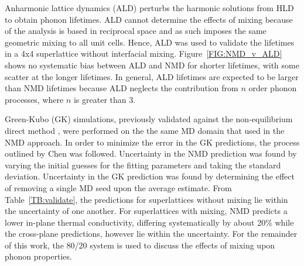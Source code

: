 Anharmonic lattice dynamics \cite{PhysRevB.79.064301} (ALD) perturbs the harmonic solutions from HLD to obtain phonon lifetimes. ALD cannot determine the effects of mixing because of the analysis is based in reciprocal space and as such imposes the same geometric mixing to all unit cells. Hence, ALD was used to validate the lifetimes in a 4x4 superlattice without interfacial mixing. Figure~\ref{FIG:NMD_v_ALD} shows no systematic bias between ALD and NMD for shorter lifetimes, with some scatter at the longer lifetimes. In general, ALD lifetimes are expected to be larger than NMD lifetimes because ALD neglects the contribution from $n$ order phonon processes, where $n$ is greater than 3. 

Green-Kubo (GK) simulations, previously validated against the non-equilibrium direct method \cite {PhysRevB.79.075316}, were performed on the the same MD domain that used in the NMD approach. In order to minimize the error in the GK predictions, the process outlined by Chen \cite{Chen20102392} was followed.  Uncertainty in the NMD prediction was found by varying the initial guesses for the fitting parameters and taking the standard deviation. Uncertainty in the GK prediction was found by determining the effect of removing a single MD seed upon the average estimate. From Table~\ref{TB:validate}, the predictions for superlattices without mixing lie within the uncertainty of one another. For superlattices with mixing, NMD predicts a lower in-plane thermal conductivity, differing systematically by about 20\% while the cross-plane predictions, however lie within the uncertainty. For the remainder of this work, the 80/20 system is used to discuss the effects of mixing upon phonon properties.



